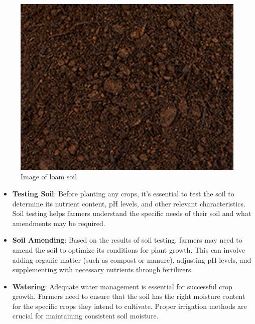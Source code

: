 \documentclass{article}
\begin{document}
\begin{flushleft}
\begin{center}
    \begin{figure}[h]
        \centering
    \includegraphics[scale=0.5]{Soil/Loam-Soil.jpg}
    \caption{Image of loam soil}
    \end{figure}
    \end{center}
\vspace*{3pt}

\begin{itemize}
\item \textbf{Testing Soil}: Before planting any crops, it's essential to test the soil to determine its nutrient content, pH levels, and other relevant characteristics. Soil testing helps farmers understand the specific needs of their soil and what amendments may be required.
\newline
\vspace*{3pt}

\item \textbf{Soil Amending}: Based on the results of soil testing, farmers may need to amend the soil to optimize its conditions for plant growth. This can involve adding organic matter (such as compost or manure), adjusting pH levels, and supplementing with necessary nutrients through fertilizers.

\item \textbf{Watering}: Adequate water management is essential for successful crop growth. Farmers need to ensure that the soil has the right moisture content for the specific crops they intend to cultivate. Proper irrigation methods are crucial for maintaining consistent soil moisture.


\end{itemize}
\end{flushleft}
\end{document}
